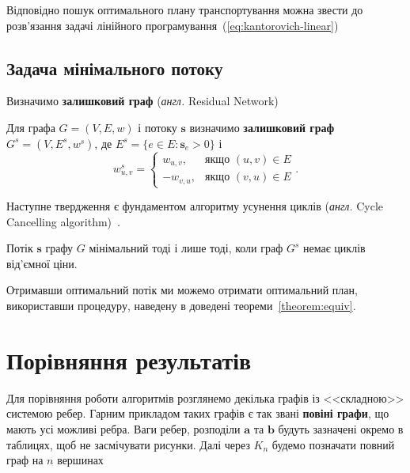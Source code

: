 Відповідно пошук оптимального плану транспортування можна звести до розв'язання задачі лінійного
програмування~(\ref{eq:kantorovich-linear})

\subsection{Задача мінімального потоку}

Визначимо \textbf{залишковий граф} (\textit{англ.} Residual Network)
\begin{definition}
    Для графа $G = (V, E, w)$ і потоку $\mathbf{s}$ визначимо \textbf{залишковий граф} $G^s = (V, E^s, w^s)$, де
    $E^s = \{e \in E : \mathbf{s}_e > 0\}$ і 
    $$
        w^s_{u, v} = \begin{cases}
            w_{u, v}, &\text{якщо }(u, v) \in E \\
            -w_{v, u}, &\text{якщо }(v, u) \in E
        \end{cases}.
    $$
\end{definition}

Наступне твердження є фундаментом алгоритму усунення циклів
(\textit{англ.} Cycle Cancelling algorithm)~\cite{cycle}.

\begin{theorem}
    Потік $\mathbf{s}$ графу $G$ мінімальний тоді і лише тоді, коли граф $G^s$ немає циклів від'ємної ціни.
\end{theorem}

Отримавши оптимальний потік ми можемо отримати оптимальний план, використавши процедуру,
наведену в доведені теореми~\ref{theorem:equiv}.

\section{Порівняння результатів}
Для порівняння роботи алгоритмів розглянемо декілька графів із <<складною>> системою ребер. Гарним прикладом таких графів
є так звані \textbf{повіні графи}, що мають усі можливі ребра. Ваги ребер, розподіли $\mathbf{a}$ та $\mathbf{b}$
будуть зазначені окремо в таблицях, щоб не засмічувати рисунки. Далі через $K_n$ будемо позначати повний граф на
$n$ вершинах

